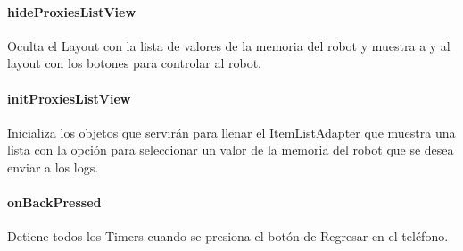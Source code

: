 \paragraph{hideProxiesListView}
\label{\detokenize{dev_docs:hideproxieslistview}}

\begin{fulllineitems}
\label{\detokenize{dev_docs:com.lar.cloudnao.RemoteControllerActivity.hideProxiesListView()}}
Oculta el Layout con la lista de valores de la memoria del robot y muestra a {\hyperref[\detokenize{dev_docs:com.lar.cloudnao.RemoteControllerActivity.mLiveImageFromRobot}]{}} y al layout con los botones para controlar al robot.

\end{fulllineitems}



\paragraph{initProxiesListView}
\label{\detokenize{dev_docs:initproxieslistview}}

\begin{fulllineitems}
\label{\detokenize{dev_docs:com.lar.cloudnao.RemoteControllerActivity.initProxiesListView()}}
Inicializa los objetos que servirán para llenar el ItemListAdapter que muestra una lista con la opción para seleccionar un valor de la memoria del robot que se desea enviar a los logs.

\end{fulllineitems}



\paragraph{onBackPressed}
\label{\detokenize{dev_docs:onbackpressed}}

\begin{fulllineitems}
\label{\detokenize{dev_docs:com.lar.cloudnao.RemoteControllerActivity.onBackPressed()}}
Detiene todos los Timers cuando se presiona el botón de Regresar en el teléfono.

\end{fulllineitems}



